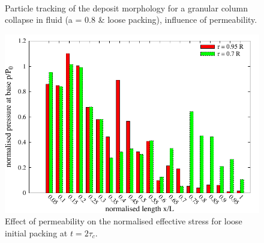 \begin{figure}
\centering
{}\\
\caption{Particle tracking of the deposit morphology
for a granular column collapse in fluid (a = 0.8 \& loose packing), influence 
of permeability.}
\label{fig:Loose_a08_permeability}
\end{figure}

\begin{figure}
\centering
\includegraphics[width=0.97\columnwidth]{a08/effective_stress_a08}
\caption{Effect of permeability on the normalised effective stress for loose 
initial packing at $t = 2\tau_c$.}
\label{fig:effective_stress_a08}
\end{figure}

